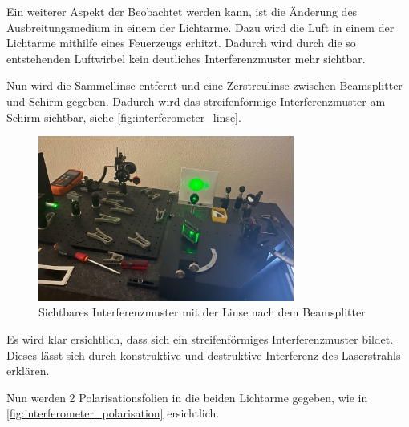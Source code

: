 \documentclass[12pt,english,ngerman]{scrartcl}
\begin{document}
Ein weiterer Aspekt der Beobachtet werden kann, ist die Änderung des Ausbreitungsmedium in einem der Lichtarme. Dazu wird die 
Luft in einem der Lichtarme mithilfe eines Feuerzeugs erhitzt. Dadurch wird durch die so entstehenden Luftwirbel kein 
deutliches Interferenzmuster mehr sichtbar.

Nun wird die Sammellinse entfernt und eine Zerstreulinse zwischen Beamsplitter und Schirm gegeben. Dadurch wird das 
streifenförmige Interferenzmuster am Schirm sichtbar, siehe \autoref{fig:interferometer_linse}.


\begin{figure}[H]
	\begin{center}
		\includegraphics[width =0.75\textwidth]{./figures/Interferometer_linse.JPG}
	\end{center}
	\caption[Sichtbares Interferenzmuster mit der Linse nach dem Beamsplitter] {
        Sichtbares Interferenzmuster mit der Linse nach dem Beamsplitter
	}\label{fig:interferometer_linse}
\end{figure}

Es wird klar ersichtlich, dass sich ein streifenförmiges Interferenzmuster bildet. Dieses lässt sich durch konstruktive 
und destruktive Interferenz des Laserstrahls erklären.

Nun werden 2 Polarisationsfolien in die beiden Lichtarme gegeben, wie in \autoref{fig:interferometer_polarisation} 
ersichtlich.
\end{document}
